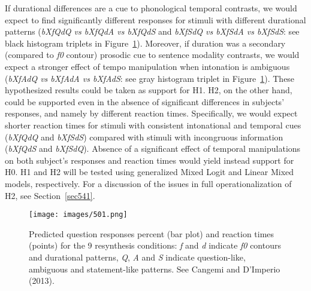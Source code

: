 If durational differences are a cue to phonological temporal contrasts, we would expect to find significantly different responses for stimuli with different durational patterns (\textit{bXfQdQ vs bXfQdA vs bXfQdS} and \textit{bXfSdQ vs bXfSdA vs bXfSdS}: see black histogram triplets in Figure~\ref{fig501}). Moreover, if duration was a secondary (compared to \textit{f0} contour) prosodic cue to sentence modality contrasts, we would expect a stronger effect of tempo manipulation when intonation is ambiguous (\textit{bXfAdQ vs bXfAdA vs bXfAdS}: see gray histogram triplet in Figure~\ref{fig501}). These hypothesized results could be taken as support for H1. H2, on the other hand, could be supported even in the absence of significant differences in subjects’ responses, and namely by different reaction times. Specifically, we would expect shorter reaction times for stimuli with consistent intonational and temporal cues (\textit{bXfQdQ} and \textit{bXfSdS}) compared with stimuli with incongruous information (\textit{bXfQdS} and \textit{bXfSdQ}). Absence of a significant effect of temporal manipulations on both subject's responses and reaction times would yield instead support for H0.
H1 and H2 will be tested using generalized Mixed Logit and Linear Mixed models, respectively. For a discussion of the issues in full operationalization of H2, see Section~\ref{sec541}.
\begin{figure}[h!]
\texttt{[image: images/501.png]}
\caption{Predicted question responses percent (bar plot) and reaction times (points) for the 9 resynthesis conditions: \textit{f} and \textit{d} indicate \textit{f0} contours and durational patterns, \textit{Q}, \textit{A} and \textit{S} indicate question-like, ambiguous and statement-like patterns. See Cangemi and D'Imperio (2013).}
\label{fig501}\end{figure}


